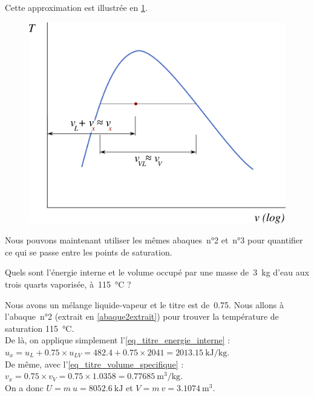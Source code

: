 \begin{description}
{				Cette approximation est illustrée en \cref{fig_titre_v}.

				\begin{figure}
					\begin{center}
						\includegraphics[width=\didacticpvdiagramwidth]{images/titre_tv_v2.png}
					\end{center}
					\label{fig_titre_v}
				\end{figure}
			} %

		\end{description}
		
		\clearfloats %
		Nous pouvons maintenant utiliser les mêmes abaques~n°2 et~n°3 pour quantifier ce qui se passe entre les points de saturation.
		
			\begin{anexample}
			
			Quels sont l’énergie interne et le volume occupé par une masse de~\SI{3}{\kilogram} d’eau aux trois quarts vaporisée, à~\SI{115}{\degreeCelsius} ?
			
				\begin{answer}
				Nous avons un mélange liquide-vapeur et le titre est de~\num{0,75}. Nous allons à l’abaque~n°2 (extrait en \cref{abaque2extrait}) pour trouver la température de saturation \SI{115}{\degreeCelsius}.\\
				De là, on applique simplement l’\cref{eq_titre_energie_interne} : $u_x = u_L + \num{0,75}\times u_{LV} = \num{482,4} + \num{0,75}\times\num{2041} = \SI{2013,15}{\kilo\joule\per\kilogram}$.\\
				De même, avec l’\cref{eq_titre_volume_specifique} : $v_x = \num{0,75}\times v_{V} = \num{0,75}\times\num{1,0358} = \SI{0,77685}{\metre\cubed\per\kilogram}$.\\				
				On a donc $U = m \ u = \SI{8052,6}{\kilo\joule} $ et $V = m \ v = \SI{3,1074}{\metre\cubed}$.
				\end{answer}
			\end{anexample}
		
